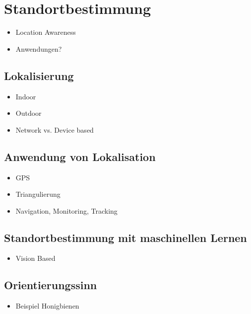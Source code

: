 \chapter{Standortbestimmung}
\begin{itemize}
    \item Location Awareness
    \item Anwendungen?
\end{itemize}

\section{Lokalisierung}
\begin{itemize}
    \item Indoor
    \item Outdoor
    \item Network vs. Device based
\end{itemize}

\section{Anwendung von Lokalisation}
\begin{itemize}
    \item GPS
    \item Triangulierung
    \item Navigation, Monitoring, Tracking
\end{itemize}

\section{Standortbestimmung mit maschinellen Lernen}
\begin{itemize}
    \item Vision Based
\end{itemize}

\section{Orientierungssinn}
\begin{itemize}
    \item Beispiel Honigbienen
\end{itemize}
